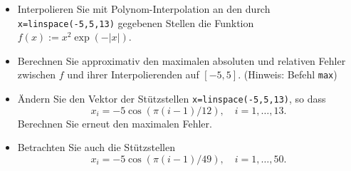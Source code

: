 \begin{aufg}[0]
\begin{itemize}
\item Interpolieren Sie mit Polynom-Interpolation an den durch \lstinline!x=linspace(-5,5,13)! gegebenen Stellen  die Funktion $f(x):=x^2\exp(-|x|)$.
\item Berechnen Sie approximativ den maximalen absoluten und relativen Fehler zwischen $f$ und
  ihrer Interpolierenden auf $[-5,5]$.
(Hinweis: Befehl \lstinline!max!)
\item Ändern Sie den Vektor der Stützstellen
  \lstinline!x=linspace(-5,5,13)!, so dass 
\[ x_i = - 5 \cos(\pi (i-1)/12), \quad i=1, \dots , 13. \]
Berechnen Sie erneut den maximalen Fehler.
\item Betrachten Sie auch die Stützstellen
\[ x_i = - 5 \cos(\pi (i-1)/49), \quad i=1, \dots , 50. \] 
\end{itemize}
\end{aufg}
